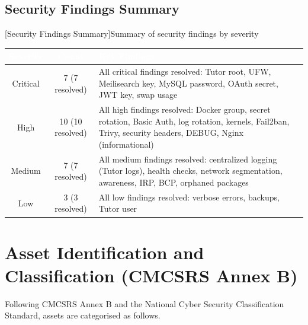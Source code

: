 \subsection{Security Findings Summary}
\begin{center}
[Security Findings Summary]{Summary of security findings by severity}
\label{tab:findings-summary}
\begin{tabularx}{\textwidth}{|c|c|X|}
\hline
\rowcolor{mooveblue}
\textcolor{white}{\textbf{Severity}} & \textcolor{white}{\textbf{Count}} & \textcolor{white}{\textbf{Key Findings}} \\
\hline
Critical & 7 (7 resolved) & All critical findings resolved: Tutor root, UFW, Meilisearch key, MySQL password, OAuth secret, JWT key, swap usage \\ \hline
High & 10 (10 resolved) & All high findings resolved: Docker group, secret rotation, Basic Auth, log rotation, kernels, Fail2ban, Trivy, security headers, DEBUG, Nginx (informational) \\ \hline
Medium & 7 (7 resolved) & All medium findings resolved: centralized logging (Tutor logs), health checks, network segmentation, awareness, IRP, BCP, orphaned packages \\ \hline
Low & 3 (3 resolved) & All low findings resolved: verbose errors, backups, Tutor user \\ \hline
\end{tabularx}
\end{center}

\section{Asset Identification and Classification (CMCSRS Annex B)}

Following CMCSRS Annex B and the National Cyber Security Classification Standard, assets are categorised as follows.

